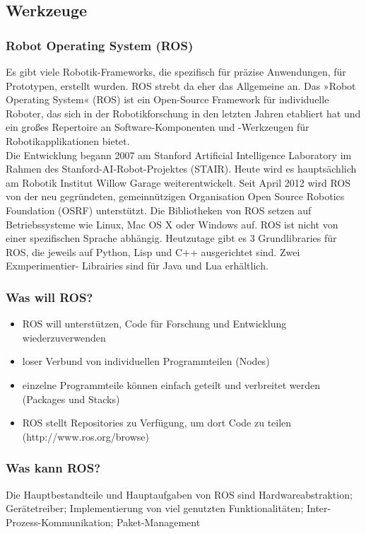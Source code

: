 \subsection{Werkzeuge}

\subsubsection{Robot Operating System (ROS)}

Es gibt viele Robotik-Frameworks, die spezifisch für präzise Anwendungen, für Prototypen,
erstellt wurden. ROS strebt da eher das Allgemeine an. Das »Robot Operating System«
(ROS) ist ein Open-Source Framework für individuelle Roboter, das sich in der
Robotikforschung in den letzten Jahren etabliert hat und ein großes Repertoire an Software-Komponenten und -Werkzeugen für Robotikapplikationen bietet.\\
Die Entwicklung begann 2007 am Stanford Artificial Intelligence Laboratory im Rahmen des
Stanford-AI-Robot-Projektes (STAIR). Heute wird es hauptsächlich am Robotik Institut Willow
Garage weiterentwickelt. Seit April 2012 wird ROS von der neu gegründeten,
gemeinnützigen Organisation Open Source Robotics Foundation (OSRF) unterstützt. Die
Bibliotheken von ROS setzen auf Betriebssysteme wie Linux, Mac OS X oder Windows auf.
ROS ist nicht von einer spezifischen Sprache abhängig. Heutzutage gibt es 3 Grundlibraries
für ROS, die jeweils auf Python, Lisp und C++ ausgerichtet sind. Zwei Exmperimentier-
Librairies sind für Java und Lua erhältlich.
\subsubsection*{Was will ROS?}
\begin{itemize}
 \item ROS will unterstützen, Code für Forschung und Entwicklung wiederzuverwenden
 \item loser Verbund von individuellen Programmteilen (Nodes)
 \item einzelne Programmteile können einfach geteilt und verbreitet werden (Packages und Stacks)
 \item ROS stellt Repositories zu Verfügung, um dort Code zu teilen \cite{ROS:2014:Online}
(http://www.ros.org/browse)
\end{itemize}
\subsubsection*{Was kann ROS?}
Die Hauptbestandteile und Hauptaufgaben von ROS sind Hardwareabstraktion; Gerätetreiber; Implementierung 
von viel genutzten Funktionalitäten; Inter-Prozess-Kommunikation; Paket-Management
